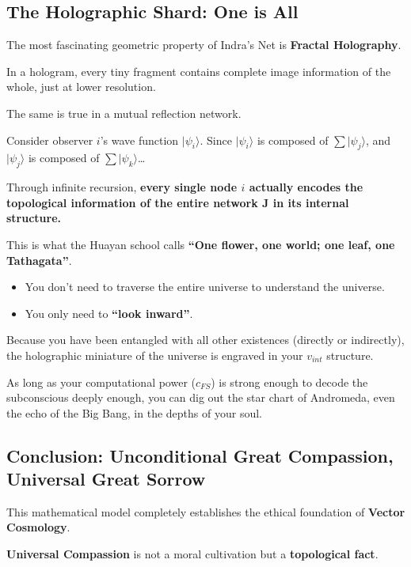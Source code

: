 \subsection{The Holographic Shard: One is All}

The most fascinating geometric property of Indra's Net is \textbf{Fractal Holography}.

In a hologram, every tiny fragment contains complete image information of the whole, just at lower resolution.

The same is true in a mutual reflection network.

Consider observer $i$'s wave function $|\psi_i\rangle$. Since $|\psi_i\rangle$ is composed of $\sum |\psi_j\rangle$, and $|\psi_j\rangle$ is composed of $\sum |\psi_k\rangle$\ldots

Through infinite recursion, \textbf{every single node $i$ actually encodes the topological information of the entire network $\mathbf{J}$ in its internal structure.}

This is what the Huayan school calls \textbf{``One flower, one world; one leaf, one Tathagata''}.

\begin{itemize}
\item You don't need to traverse the entire universe to understand the universe.

\item You only need to \textbf{``look inward''}.
\end{itemize}

Because you have been entangled with all other existences (directly or indirectly), the holographic miniature of the universe is engraved in your $v_{int}$ structure.

As long as your computational power ($c_{FS}$) is strong enough to decode the subconscious deeply enough, you can dig out the star chart of Andromeda, even the echo of the Big Bang, in the depths of your soul.

\subsection{Conclusion: Unconditional Great Compassion, Universal Great Sorrow}

This mathematical model completely establishes the ethical foundation of \textbf{Vector Cosmology}.

\textbf{Universal Compassion} is not a moral cultivation but a \textbf{topological fact}.

